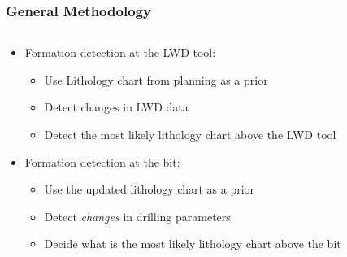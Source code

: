 \documentclass{beamer}
\begin{document}
\begin{frame} \frametitle{General Methodology} 
\vspace{-1cm}

\begin{columns}[onlytextwidth]
\begin{column}{0.6\textwidth}

\begin{itemize}
\item<1-> Formation detection at the LWD tool:
\begin{itemize}
\item<2-> Use Lithology chart from planning as a prior 
\item<3-> Detect changes in LWD data 
\item<4-> Detect the most likely lithology chart above the LWD tool
\end{itemize}

\item<5-> Formation detection at the bit:
\begin{itemize}
\item<6-> Use the updated lithology chart as a prior
\item<7-> Detect \emph{changes} in drilling parameters
\item<8-> Decide what is the most likely lithology chart above the bit
\end{itemize}
\end{itemize}
 \end{column}

\begin{column}{0.4\textwidth}



\end{column}
\end{columns}
\end{frame}
\end{document}
